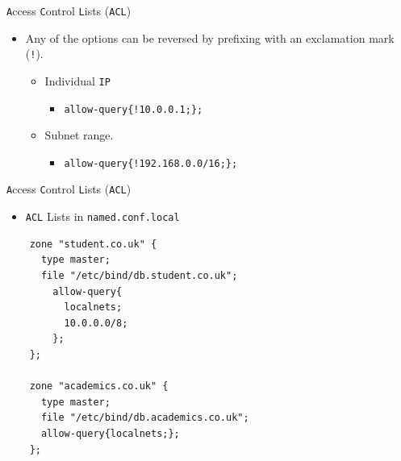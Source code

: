 \documentclass[aspectratio=169,xcolor=table]{beamer}
\begin{document}
\begin{frame}{\texttt{A}ccess \texttt{C}ontrol \texttt{L}ists (\texttt{ACL})}
  \begin{itemize}
    \item Any of the options can be reversed by prefixing with an exclamation mark (\texttt{!}).
      \begin{itemize}
        \item Individual \texttt{IP}
          \begin{itemize}
            \item \texttt{allow-query\{!10.0.0.1;\};}
          \end{itemize}
        \item Subnet range.
          \begin{itemize}
            \item \texttt{allow-query\{!192.168.0.0/16;\};}
          \end{itemize}
        \end{itemize}
  \end{itemize}
\end{frame}

\begin{frame}[fragile]{\texttt{A}ccess \texttt{C}ontrol \texttt{L}ists (\texttt{ACL})}
  \begin{itemize}
    \item \texttt{ACL} Lists in \texttt{named.conf.local}
  \end{itemize}
  \lstset{
    basicstyle=\small\ttfamily,
  }
  \begin{lstlisting}
    zone "student.co.uk" {
      type master;
      file "/etc/bind/db.student.co.uk";
        allow-query{
          localnets;
          10.0.0.0/8;
        };
    };
    
    zone "academics.co.uk" {
      type master;
      file "/etc/bind/db.academics.co.uk";
      allow-query{localnets;};
    };
  \end{lstlisting}
\end{frame}
\end{document}
